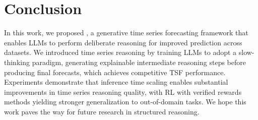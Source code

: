 
\vspace{0.08in}
\section{Conclusion}


In this work, we proposed \Ours, a generative time series forecasting framework that enables LLMs to perform deliberate reasoning for improved prediction across datasets. We introduced time series reasoning by training LLMs to adopt a slow-thinking paradigm, generating explainable intermediate reasoning steps before producing final forecasts, which achieves competitive TSF performance. Experiments demonstrate that inference time scaling enables substantial improvements in time series reasoning quality, with RL with verified rewards methods yielding stronger generalization to out-of-domain tasks. We hope this work paves the way for future research in structured reasoning.




